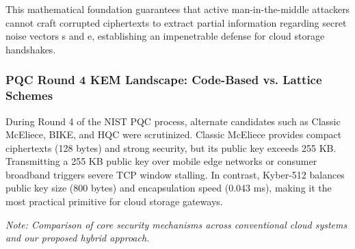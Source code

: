 \documentclass[5p,times]{elsarticle}
\begin{document}
This mathematical foundation guarantees that active man-in-the-middle attackers cannot craft corrupted ciphertexts to extract partial information regarding secret noise vectors s and e, establishing an impenetrable defense for cloud storage handshakes.


\subsubsection{PQC Round 4 KEM Landscape: Code-Based vs. Lattice Schemes}

During Round 4 of the NIST PQC process, alternate candidates such as Classic McEliece, BIKE, and HQC were scrutinized. Classic McEliece provides compact ciphertexts (128 bytes) and strong security, but its public key exceeds 255 KB. Transmitting a 255 KB public key over mobile edge networks or consumer broadband triggers severe TCP window stalling. In contrast, Kyber-512 balances public key size (800 bytes) and encapsulation speed (0.043 ms), making it the most practical primitive for cloud storage gateways.

\begin{table}[!ht]
  \centering
  \caption{Architectural Comparison across Classical, Pure Post-Quantum, and Hybrid Cloud Storage Systems}
  \vspace{2pt}
  \par\raggedright\footnotesize\textit{\textit{Note:} Comparison of core security mechanisms across conventional cloud systems and our proposed hybrid approach.}
\end{table}
\end{document}
